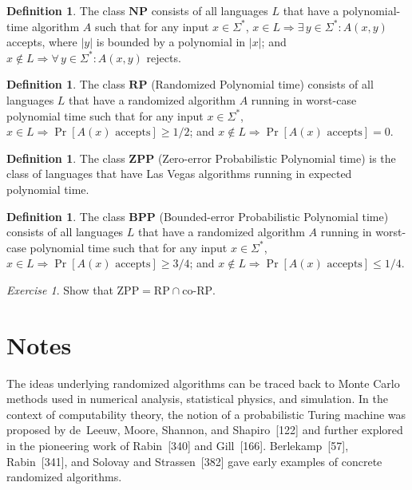 \documentclass[twoside,12pt]{book}
\theoremstyle{plain}
\theoremstyle{definition}
\newtheorem{definition}[theorem]{Definition}
\theoremstyle{remark}
\newtheorem{exercise}[theorem]{Exercise}
\begin{document}
\begin{definition}
The class $\mathbf{NP}$ consists of all languages $L$ that have a
polynomial-time algorithm $A$ such that for any input $x\in\Sigma^*$,
$x\in L \Rightarrow \exists\, y\in\Sigma^*: A(x,y)$ accepts, where
$|y|$ is bounded by a polynomial in $|x|$; and
$x\notin L \Rightarrow \forall\, y\in\Sigma^*: A(x,y)$ rejects.
\end{definition}

\begin{definition}
The class $\mathbf{RP}$ (Randomized Polynomial time) consists of all
languages $L$ that have a randomized algorithm $A$ running in worst-case
polynomial time such that for any input $x\in\Sigma^*$,
$x\in L \Rightarrow \Pr[A(x)\text{ accepts}]\ge 1/2$; and
$x\notin L \Rightarrow \Pr[A(x)\text{ accepts}]=0$.
\end{definition}

\begin{definition}
The class $\mathbf{ZPP}$ (Zero-error Probabilistic Polynomial time) is the
class of languages that have Las Vegas algorithms running in expected
polynomial time.
\end{definition}

\begin{definition}
The class $\mathbf{BPP}$ (Bounded-error Probabilistic Polynomial time)
consists of all languages $L$ that have a randomized algorithm $A$ running
in worst-case polynomial time such that for any input $x\in\Sigma^*$,
$x\in L \Rightarrow \Pr[A(x)\text{ accepts}]\ge 3/4$; and
$x\notin L \Rightarrow \Pr[A(x)\text{ accepts}]\le 1/4$.
\end{definition}

\begin{exercise}
Show that $\mathrm{ZPP}=\mathrm{RP}\cap\mathrm{co\text{-}RP}$.
\end{exercise}



\section*{Notes}

The ideas underlying randomized algorithms can be traced back to Monte Carlo
methods used in numerical analysis, statistical physics, and simulation.  In
the context of computability theory, the notion of a probabilistic Turing
machine was proposed by de~Leeuw, Moore, Shannon, and Shapiro~[122] and
further explored in the pioneering work of Rabin~[340] and
Gill~[166].  Berlekamp~[57], Rabin~[341], and Solovay and
Strassen~[382] gave early examples of concrete randomized algorithms.
\end{document}
